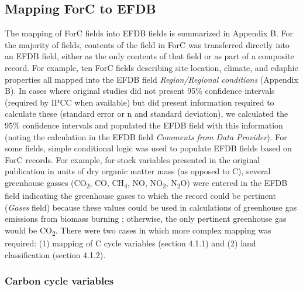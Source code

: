 \documentclass[, manuscript]{copernicus}
\begin{document}
\subsection{Mapping ForC to EFDB}

The mapping of ForC fields into EFDB fields is summarized in Appendix B.
For the majority of fields, contents of the field in ForC was
transferred directly into an EFDB field, either as the only contents of
that field or as part of a composite record. For example, ten ForC
fields describing site location, climate, and edaphic properties all
mapped into the EFDB field \emph{Region/Regional conditions} (Appendix
B). In cases where original studies did not present 95\% confidence
intervals (required by IPCC when available) but did present information
required to calculate these (standard error or n and standard
deviation), we calculated the 95\% confidence intervals and populated
the EFDB field with this information (noting the calculation in the EFDB
field \emph{Comments from Data Provider}). For some fields, simple
conditional logic was used to populate EFDB fields based on ForC
records. For example, for stock variables presented in the original
publication in units of dry organic matter mass (as opposed to C),
several greenhouse gasses (CO\textsubscript{2}, CO, CH\textsubscript{4},
NO, NO\textsubscript{2}, N\textsubscript{2}O) were entered in the EFDB
field indicating the greenhouse gases to which the record could be
pertinent (\emph{Gases} field) because these values could be used in
calculations of greenhouse gas emissions from biomass burning
\citep{ipcc_2006_2006}; otherwise, the only pertinent greenhouse gas
would be CO\textsubscript{2}. There were two cases in which more complex
mapping was required: (1) mapping of C cycle variables (section 4.1.1)
and (2) land classification (section 4.1.2).

\subsubsection{Carbon cycle variables}
\end{document}
